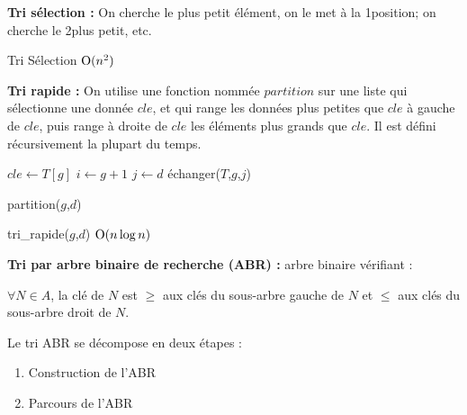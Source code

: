 \documentclass[a4paper, 8pt]{article}
\begin{document}
\begin{multicols*}{3}
\textbf{Tri sélection :} On cherche le plus petit élément, on le met à la 1\iere position; on cherche le 2\ieme plus petit, etc.

\begin{algorithm}[H]
 \caption{Tri Sélection $\text{O}(n^2)$}
\end{algorithm}

\textbf{Tri rapide :} On utilise une fonction nommée $partition$ sur une liste qui sélectionne une donnée $cle$, et qui range les données plus petites que $cle$ à gauche de $cle$, puis range à droite de $cle$ les éléments plus grands que $cle$. Il est défini récursivement la plupart du temps.
\begin{algorithm}[H]
  $cle \longleftarrow T\left[g\right]$ \;
  $i \longleftarrow g+1$ \;
  $j \longleftarrow d$ \;
  	échanger($T$,$g$,$j$)\;
 \caption{partition($g$,$d$)}
\end{algorithm}
\begin{algorithm}[H]
 \caption{tri\_rapide($g$,$d$) $\text{O}(n\log n)$}
\end{algorithm}
\medskip

\textbf{Tri par arbre binaire de recherche (ABR) :} arbre binaire vérifiant :
\begin{changemargin}{0.5cm}{0.5cm} 
\begin{center}
$\forall N\in A$, la clé de $N$ est $\geqslant$ aux clés du sous-arbre gauche de $N$ et $\leqslant$ aux clés du sous-arbre droit de $N$.
\end{center}
\end{changemargin}

Le tri ABR se décompose en deux étapes :
\begin{enumerate}
\item Construction de l'ABR 
\item Parcours de l'ABR
\end{enumerate}


\end{multicols*}
\end{document}
